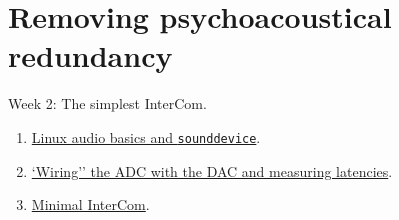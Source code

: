 \section{Removing psychoacoustical redundancy}

\item Week 2: The simplest InterCom.
\begin{enumerate}
\item \href{https://tecnologias-multimedia.github.io/study_guide/Linux_audio/}{Linux audio basics and \texttt{sounddevice}}.
\item \href{https://tecnologias-multimedia.github.io/study_guide/04-wiring/}{`Wiring'' the ADC with the DAC and measuring latencies}.
\item \href{https://tecnologias-multimedia.github.io/study_guide/05-minimal/}{Minimal InterCom}.
\end{enumerate}

